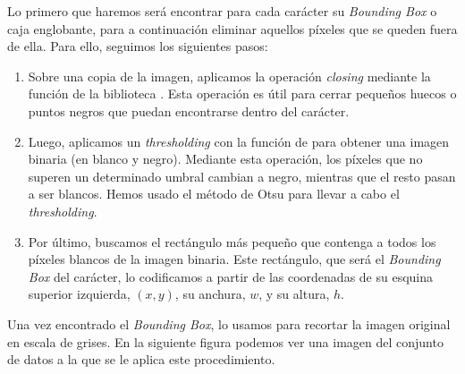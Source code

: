 \documentclass[a4]{article}
\begin{document}
Lo primero que haremos será encontrar para cada carácter su \textit{Bounding Box} o caja englobante, para a continuación eliminar aquellos píxeles que se queden fuera de ella. Para ello, seguimos los siguientes pasos:

\begin{enumerate}
    \item Sobre una copia de la imagen, aplicamos la operación \textit{closing} mediante la función  de la biblioteca . Esta operación es útil para cerrar pequeños huecos o puntos negros que puedan encontrarse dentro del carácter.
    \item Luego, aplicamos un \textit{thresholding} con la función  de  para obtener una imagen binaria (en blanco y negro). Mediante esta operación, los píxeles que no superen un determinado umbral cambian a negro, mientras que el resto pasan a ser blancos. Hemos usado el método de Otsu para llevar a cabo el \textit{thresholding}.
    \item Por último, buscamos el rectángulo más pequeño que contenga a todos los píxeles blancos de la imagen binaria. Este rectángulo, que será el \textit{Bounding Box} del carácter, lo codificamos a partir de las coordenadas de su esquina superior izquierda, $(x,y)$, su anchura, $w$, y su altura, $h$.
\end{enumerate}

Una vez encontrado el \textit{Bounding Box}, lo usamos para recortar la imagen original en escala de grises. En la siguiente figura podemos ver una imagen del conjunto de datos a la que se le aplica este procedimiento.
\end{document}
